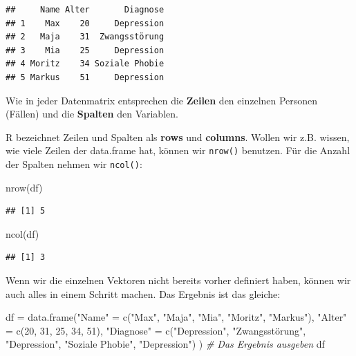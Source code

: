 \documentclass[
]{book}
\newenvironment{Shaded}{\begin{snugshade}}{\end{snugshade}}
\newcommand{\CommentTok}[1]{\textcolor[rgb]{0.56,0.35,0.01}{\textit{#1}}}
\newcommand{\DecValTok}[1]{\textcolor[rgb]{0.00,0.00,0.81}{#1}}
\newcommand{\FunctionTok}[1]{\textcolor[rgb]{0.00,0.00,0.00}{#1}}
\newcommand{\NormalTok}[1]{#1}
\newcommand{\OtherTok}[1]{\textcolor[rgb]{0.56,0.35,0.01}{#1}}
\newcommand{\StringTok}[1]{\textcolor[rgb]{0.31,0.60,0.02}{#1}}
\begin{document}
\begin{verbatim}
##     Name Alter       Diagnose
## 1    Max    20     Depression
## 2   Maja    31  Zwangsstörung
## 3    Mia    25     Depression
## 4 Moritz    34 Soziale Phobie
## 5 Markus    51     Depression
\end{verbatim}

Wie in jeder Datenmatrix entsprechen die \textbf{Zeilen} den einzelnen Personen (Fällen) und die \textbf{Spalten} den Variablen.

R bezeichnet Zeilen und Spalten als \textbf{rows} und \textbf{columns}. Wollen wir z.B. wissen, wie viele Zeilen der data.frame hat, können wir \texttt{nrow()} benutzen. Für die Anzahl der Spalten nehmen wir \texttt{ncol()}:

\begin{Shaded}
\begin{Highlighting}[]
\FunctionTok{nrow}\NormalTok{(df)}
\end{Highlighting}
\end{Shaded}

\begin{verbatim}
## [1] 5
\end{verbatim}

\begin{Shaded}
\begin{Highlighting}[]
\FunctionTok{ncol}\NormalTok{(df)}
\end{Highlighting}
\end{Shaded}

\begin{verbatim}
## [1] 3
\end{verbatim}

Wenn wir die einzelnen Vektoren nicht bereits vorher definiert haben, können wir auch alles in einem Schritt machen. Das Ergebnis ist das gleiche:

\begin{Shaded}
\begin{Highlighting}[]
\NormalTok{df }\OtherTok{=} \FunctionTok{data.frame}\NormalTok{(}\StringTok{"Name"} \OtherTok{=} \FunctionTok{c}\NormalTok{(}\StringTok{"Max"}\NormalTok{, }\StringTok{"Maja"}\NormalTok{, }\StringTok{"Mia"}\NormalTok{, }\StringTok{"Moritz"}\NormalTok{, }\StringTok{"Markus"}\NormalTok{),}
                \StringTok{"Alter"} \OtherTok{=} \FunctionTok{c}\NormalTok{(}\DecValTok{20}\NormalTok{, }\DecValTok{31}\NormalTok{, }\DecValTok{25}\NormalTok{, }\DecValTok{34}\NormalTok{, }\DecValTok{51}\NormalTok{),}
                \StringTok{"Diagnose"} \OtherTok{=} \FunctionTok{c}\NormalTok{(}\StringTok{"Depression"}\NormalTok{, }\StringTok{"Zwangsstörung"}\NormalTok{, }\StringTok{"Depression"}\NormalTok{, }\StringTok{"Soziale Phobie"}\NormalTok{, }\StringTok{"Depression"}\NormalTok{)}
\NormalTok{                )}
\CommentTok{\# Das Ergebnis ausgeben}
\NormalTok{df}
\end{Highlighting}
\end{Shaded}
\end{document}
